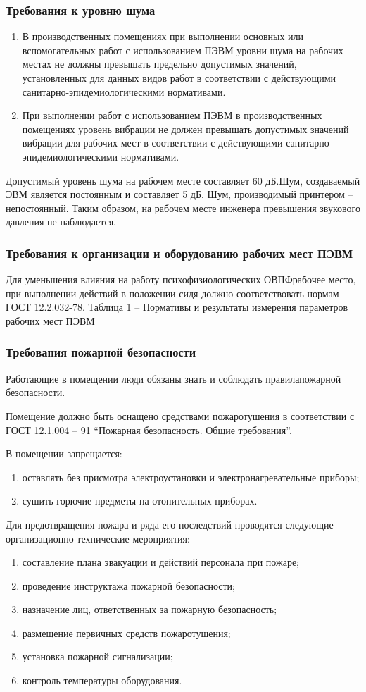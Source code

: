 \subsubsection{Требования к уровню шума}
\begin{enumerate}
\item В производственных помещениях при выполнении основных или вспомогательных работ с использованием ПЭВМ уровни шума на рабочих местах не должны превышать предельно допустимых значений, установленных для данных видов работ в соответствии с действующими санитарно-эпидемиологическими нормативами. 
\item При выполнении работ с использованием ПЭВМ в производственных помещениях уровень вибрации не должен превышать допустимых значений вибрации для рабочих мест в соответствии с действующими санитарно-эпидемиологическими нормативами.
\end{enumerate}
Допустимый уровень шума на рабочем месте составляет 60 дБ.Шум, создаваемый ЭВМ является постоянным и составляет 5 дБ. Шум, производимый принтером – непостоянный. Таким образом, на рабочем месте инженера превышения звукового давления не наблюдается.
\subsubsection{Требования к организации и оборудованию рабочих мест ПЭВМ}
Для уменьшения влияния на работу психофизиологических ОВПФрабочее место, при выполнении действий в положении сидя должно соответствовать нормам ГОСТ 12.2.032-78.
Таблица 1 – Нормативы и результаты измерения параметров рабочих мест ПЭВМ
\subsubsection{Требования пожарной безопасности}
Работающие в помещении люди обязаны знать и соблюдать правилапожарной безопасности.

Помещение должно быть оснащено средствами пожаротушения в соответствии с ГОСТ 12.1.004 – 91 ``Пожарная безопасность. Общие требования''.

В помещении запрещается:
\begin{enumerate}
\item оставлять без присмотра электроустановки и электронагревательные приборы;
\item сушить горючие предметы на отопительных приборах.
\end{enumerate}

Для предотвращения пожара и ряда его последствий проводятся следующие организационно-технические мероприятия:
\begin{enumerate}
\item составление плана эвакуации и действий персонала при пожаре;
\item проведение инструктажа пожарной безопасности;
\item назначение лиц, ответственных за пожарную безопасность;
\item размещение первичных средств пожаротушения;
\item установка пожарной сигнализации;
\item контроль температуры оборудования.
\end{enumerate}

